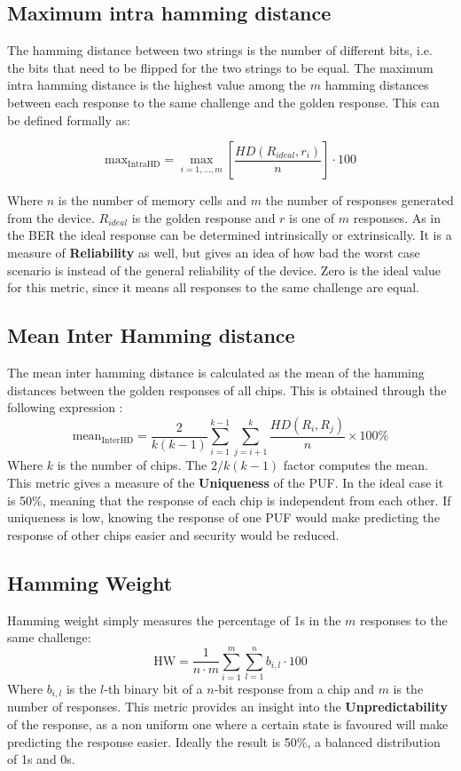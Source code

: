 \subsection{Maximum intra hamming distance}

  The hamming distance between two strings is the number of different bits, i.e. the bits that need to be flipped for the two strings to be equal. The maximum intra hamming distance is the highest value among the $m$ hamming distances between each response to the same challenge and the golden response. This can be defined formally as:

\begin{equation}
\label{eq:maxihd}
\text{max}_\text{IntraHD}=\max _{i=1, \ldots, m}\left[\frac{H D\left(R_{ideal}, r_{i}\right)}{n}\right] \cdot 100\end{equation}

Where $n$ is the number of memory cells and $m$ the number of responses generated from the device. $R_{ideal}$ is the golden response and $r$ is one of $m$ responses. As in the BER the ideal response can be determined intrinsically or extrinsically. It is a measure of \textbf{Reliability} as well, but gives an idea of how bad the worst case scenario is instead of the general reliability of the device. Zero is the ideal value for this metric, since it means all responses to the same challenge are equal.

\subsection{Mean Inter Hamming distance}
\label{eq:interhd}
The mean inter hamming distance is calculated as the mean of the hamming distances between the golden responses of all chips. This is obtained through the following expression \cite{Maiti2013}:
\begin{equation}\text{mean}_\text{InterHD}=\frac{2}{k(k-1)} \sum_{i=1}^{k-1} \sum_{j=i+1}^{k} \frac{H D\left(R_{i}, R_{j}\right)}{n} \times 100 \%\end{equation}
Where $k$ is the number of chips. The $2/k(k-1)$ factor computes the mean. This metric gives a measure of the \textbf{Uniqueness} of the PUF. In the ideal case it is 50\%, meaning that the response of each chip is independent from each other. If uniqueness is low, knowing the response of one PUF would make predicting the response of other chips easier and security would be reduced.
\subsection{Hamming Weight}
Hamming weight simply measures the percentage of 1s in the $m$ responses to the same challenge:
\begin{equation}\text{HW}=\frac{1}{n\cdot m} \sum_{i=1}^{m} \sum_{l=1}^{n} b_{i,l} \cdot 100 \end{equation}
Where $b_{i,l}$ is the $l$-th binary bit of a $n$-bit response from a chip and $m$ is the number of responses. This metric provides an insight into the \textbf{Unpredictability} of the response, as a non uniform one where a certain state is favoured will make predicting the response easier. Ideally the result is 50\%, a balanced distribution of 1s and 0s. 

